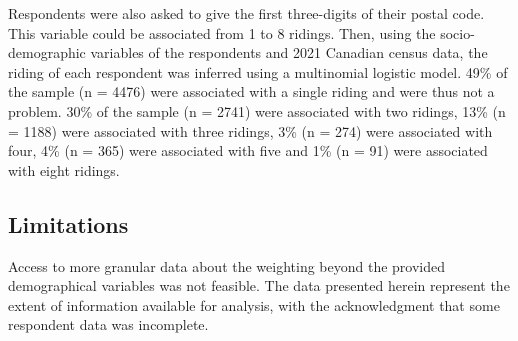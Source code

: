 \documentclass[
  journal=medium,
  manuscript=article-type,
  year=2024
]{cup-journal}
\begin{document}
Respondents were also asked to give the first three-digits of their postal code. This variable could be associated from 1 to 8 ridings. Then, using the socio-demographic variables of the respondents and 2021 Canadian census data, the riding of each respondent was inferred using a multinomial logistic model. 49\% of the sample (n = 4476) were associated with a single riding and were thus not a problem. 30\% of the sample (n = 2741) were associated with two ridings, 13\% (n = 1188) were associated with three ridings, 3\% (n = 274) were associated with four, 4\% (n = 365) were associated with five and 1\% (n = 91) were associated with eight ridings.

\subsection{Limitations}
Access to more granular data about the weighting beyond the provided demographical variables was not feasible. The data presented herein represent the extent of information available for analysis, with the acknowledgment that some respondent data was incomplete.
\end{document}
